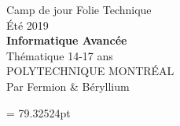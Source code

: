 \documentclass[]{report}
\begin{document}

\begin{titlepage}
\begin{center}

\Huge{Camp de jour Folie Technique
\\
Été 2019}
\\[3.25 in]
\huge \textbf{Informatique Avancée}
\\
\Large Thématique 14-17 ans
\\[3.25 in]
POLYTECHNIQUE MONTRÉAL
\\
Par Fermion \& Béryllium

\end{center}
\end{titlepage}

\restoregeometry

\headheight = 79.32524pt

\begin{adjustwidth}{1.5cm}{0cm}
\tableofcontents\thispagestyle{fancy}
\end{adjustwidth}

\newpage
\end{document}
